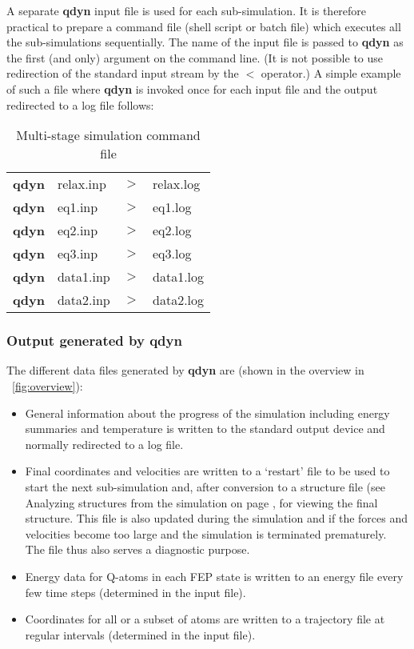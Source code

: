 \documentclass[a4paper,10pt]{article}
\begin{document}
A separate \textbf{qdyn} input file is used for each sub-simulation. It is
therefore practical to prepare a command file (shell script or
batch file) which executes all the sub-simulations sequentially.
The name of the input file is passed to \textbf{qdyn} as the first (and
only) argument on the command line. (It is not possible to use
redirection of the standard input stream by the $<$ operator.) A
simple example of such a file where \textbf{qdyn} is invoked once for each
input file and the output redirected to a log file follows:

\begin{table}[htbp]
\begin{center}
\caption{Multi-stage simulation command file}
\begin{tabularx}{\textwidth}{|l l l X|}
  \hline
  \textbf{qdyn} & relax.inp & $>$ & relax.log \\
  \textbf{qdyn} & eq1.inp   & $>$ & eq1.log \\
  \textbf{qdyn} & eq2.inp   & $>$ & eq2.log \\
  \textbf{qdyn} & eq3.inp   & $>$ & eq3.log \\
  \textbf{qdyn} & data1.inp & $>$ & data1.log \\
  \textbf{qdyn} & data2.inp & $>$ & data2.log \\ \hline
\end{tabularx}
\end{center}
\end{table}

\subsubsection{Output generated by \textbf{qdyn}} The different data files
generated by \textbf{qdyn} are (shown in the overview in
\figurename~\ref{fig:overview}):

\begin{itemize}
\item General information about the progress of the simulation including
energy summaries and temperature is written to the standard output
device and normally redirected to a log file.
\item Final coordinates and velocities are written to a `restart' file to be
used to start the next sub-simulation and, after conversion to a
structure file (see Analyzing structures from the simulation on
page \pageref{subsubsec:Analyzing_struc_f_t_sim}, for viewing the
final structure. This file is also updated during the simulation
and if the forces and velocities become too large and the
simulation is terminated prematurely. The file thus also serves a
diagnostic purpose.
\item Energy data for Q-atoms in each FEP state is written to an
energy file every few time steps (determined in the input file).
\item Coordinates for all or a subset of atoms are written to a trajectory
file at regular intervals (determined in the input file).
\end{itemize}
\end{document}
